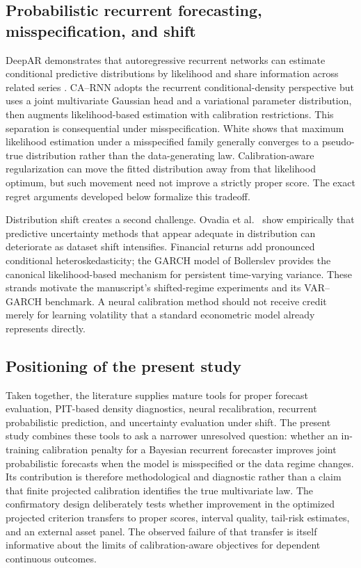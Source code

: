 \documentclass[11pt]{article}
\begin{document}
\subsection{Probabilistic recurrent forecasting, misspecification, and shift}

DeepAR demonstrates that autoregressive recurrent networks can estimate
conditional predictive distributions by likelihood and share information across
related series \cite{salinas2020deepar}.  CA--RNN adopts the recurrent
conditional-density perspective but uses a joint multivariate Gaussian head and
a variational parameter distribution, then augments likelihood-based estimation
with calibration restrictions.  This separation is consequential under
misspecification.  White \cite{white1982misspecification} shows that maximum
likelihood estimation under a misspecified family generally converges to a
pseudo-true distribution rather than the data-generating law.  Calibration-aware
regularization can move the fitted distribution away from that likelihood
optimum, but such movement need not improve a strictly proper score.  The exact
regret arguments developed below formalize this tradeoff.

Distribution shift creates a second challenge.  Ovadia et al.\
\cite{ovadia2019shift} show empirically that predictive uncertainty methods that
appear adequate in distribution can deteriorate as dataset shift intensifies.
Financial returns add pronounced conditional heteroskedasticity; the GARCH model
of Bollerslev \cite{bollerslev1986garch} provides the canonical likelihood-based
mechanism for persistent time-varying variance.  These strands motivate the
manuscript's shifted-regime experiments and its VAR--GARCH benchmark.  A neural
calibration method should not receive credit merely for learning volatility that
a standard econometric model already represents directly.

\subsection{Positioning of the present study}

Taken together, the literature supplies mature tools for proper forecast
evaluation, PIT-based density diagnostics, neural recalibration, recurrent
probabilistic prediction, and uncertainty evaluation under shift.  The present
study combines these tools to ask a narrower unresolved question: whether an
in-training calibration penalty for a Bayesian recurrent forecaster improves
joint probabilistic forecasts when the model is misspecified or the data regime
changes.  Its contribution is therefore methodological and diagnostic rather
than a claim that finite projected calibration identifies the true multivariate
law.  The confirmatory design deliberately tests whether improvement in the
optimized projected criterion transfers to proper scores, interval quality,
tail-risk estimates, and an external asset panel.  The observed failure of that
transfer is itself informative about the limits of calibration-aware objectives
for dependent continuous outcomes.
\end{document}
